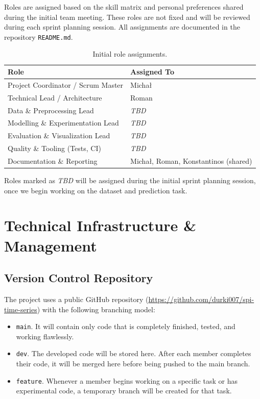 \documentclass[runningheads]{llncs}
\begin{document}
Roles are assigned based on the skill matrix and personal preferences shared during the initial team meeting. These roles are not fixed and will be reviewed during each sprint planning session. All assignments are documented in the repository \texttt{README.md}.

\begin{table}
    \caption{Initial role assignments.}\label{tab:roles}
    \centering
    \begin{tabular}{@{}ll@{}}
        \toprule
        \textbf{Role}                      & \textbf{Assigned To}                 \\
        \midrule
        Project Coordinator / Scrum Master & Michał                               \\
        Technical Lead / Architecture      & Roman                                \\
        Data \& Preprocessing Lead         & \textit{TBD}                         \\
        Modelling \& Experimentation Lead  & \textit{TBD}                         \\
        Evaluation \& Visualization Lead   & \textit{TBD}                         \\
        Quality \& Tooling (Tests, CI)     & \textit{TBD}                         \\
        Documentation \& Reporting         & Michał, Roman, Konstantinos (shared) \\
        \bottomrule
    \end{tabular}
\end{table}

Roles marked as \textit{TBD} will be assigned during the initial sprint planning session, once we begin working on the dataset and prediction task.

\section{Technical Infrastructure \& Management}

\subsection{Version Control Repository}

The project uses a public GitHub repository (\url{https://github.com/durki007/spi-time-series}) with the following branching model:

\begin{itemize}
    \item \texttt{main}. It will contain only code that is completely finished, tested, and working flawlessly.
    \item \texttt{dev}. The developed code will be stored here. After each member completes their code, it will be merged here before being pushed to the main branch.
    \item \texttt{feature}. Whenever a member begins working on a specific task or has experimental code, a temporary branch will be created for that task.
\end{itemize}
\end{document}
